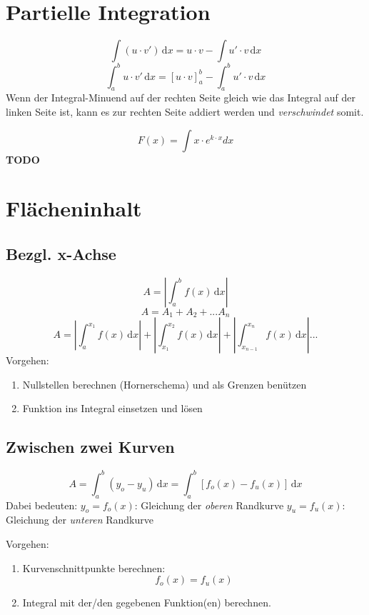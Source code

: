 \section{Partielle Integration} %
\label{sec:partielle_integration}
\[ \int (u \cdot v')\,\mathrm{d}x = u \cdot v - \int u' \cdot v\,\mathrm{d}x \]
\[ \int_a^b u \cdot v'\,\mathrm{d}x = [u \cdot v]_a^b - \int_a^b u' \cdot v\,\mathrm{d}x \]
Wenn der Integral-Minuend auf der rechten Seite gleich wie das Integral auf der linken Seite ist, kann es zur rechten Seite addiert werden und \emph{verschwindet} somit.

\begin{bsp}
$$F(x) = \int x \cdot e^{k \cdot x} dx$$
\textbf{TODO}
\end{bsp}


\section{Flächeninhalt} %
\label{sec:flächeninhalt}
\subsection{Bezgl. x-Achse} %
\label{sub:bezgl_x_achse}
\[ A = \left| \int_a^b f(x)\,\mathrm{d}x \right|\]
\[ A = A_1 + A_2 + ... A_n\]
\[ A = \left| \int_a^{x_1} f(x)\,\mathrm{d}x \right| + \left| \int_{x_1}^{x_2} f(x)\,\mathrm{d}x \right| + \left| \int_{x_{n-1}}^{x_n} f(x)\,\mathrm{d}x \right| ... \]
\newline Vorgehen:\newline
\begin{enumerate}
	\item Nullstellen berechnen (Hornerschema) und als Grenzen benützen
	\item Funktion ins Integral einsetzen und lösen
\end{enumerate}

\subsection{Zwischen zwei Kurven} %
\label{sub:zwischen_zwei_kurven}
\[ A = \int_a^b (y_o - y_u)\,\mathrm{d}x = \int_a^b [f_o(x) - f_u(x)]\,\mathrm{d}x\]
Dabei bedeuten:\newline
\( y_o = f_o(x)\): Gleichung der \emph{oberen} Randkurve\newline
\( y_u = f_u(x)\): Gleichung der \emph{unteren} Randkurve

Vorgehen:\newline
\begin{enumerate}
	\item Kurvenschnittpunkte berechnen:
	\[f_o(x) = f_u(x)\]
	\item Integral mit der/den gegebenen Funktion(en) berechnen.
\end{enumerate}

